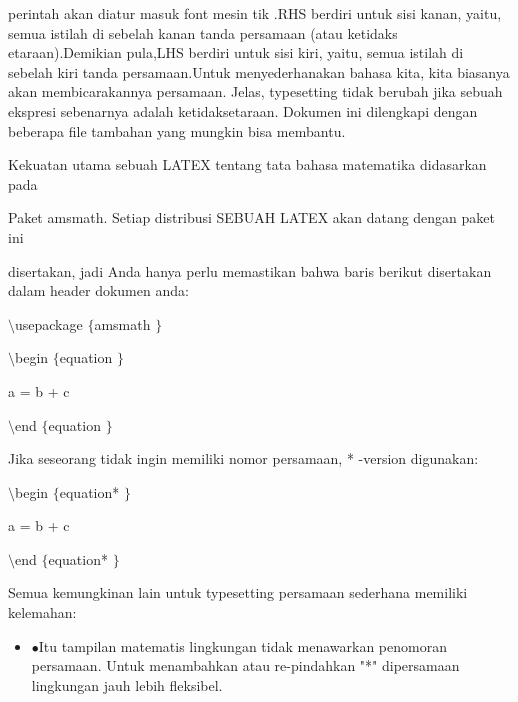 \noindent 
perintah akan diatur masuk font mesin tik .RHS berdiri untuk sisi kanan, yaitu, semua istilah di sebelah kanan tanda persamaan (atau ketidaks etaraan).Demikian pula,LHS berdiri untuk sisi kiri, yaitu, semua istilah di sebelah kiri tanda persamaan.Untuk menyederhanakan bahasa kita, kita biasanya akan membicarakannya persamaan. Jelas, typesetting tidak berubah jika sebuah ekspresi sebenarnya adalah ketidaksetaraan. Dokumen ini dilengkapi dengan beberapa file tambahan yang mungkin bisa membantu. \par
\noindent 
 \hspace*{0.5in} Kekuatan utama sebuah LATEX tentang tata bahasa matematika didasarkan pada \par
\noindent 
Paket amsmath. Setiap distribusi SEBUAH LATEX akan datang dengan paket ini \par
\noindent 
disertakan, jadi Anda hanya perlu memastikan bahwa baris berikut disertakan dalam header dokumen anda: \par
\noindent 
\vspace{10pt}
\noindent 
 $  \setminus  $usepackage $  \{  $amsmath $  \}  $ \par
\noindent 
\vspace{12pt}
\noindent 
 $  \setminus  $begin $  \{  $equation $  \}  $ \par
\vspace{12pt}
\noindent 
a = b + c \par
\vspace{12pt}
\noindent 
 $  \setminus  $end $  \{  $equation $  \}  $ \par
\vspace{12pt}
\noindent 
Jika seseorang tidak ingin memiliki nomor persamaan, * -version digunakan: \par
\vspace{12pt}
\noindent 
 $  \setminus  $begin $  \{  $equation* $  \}  $ \par
\vspace{12pt}
\noindent 
a = b + c \par
\vspace{12pt}
\noindent 
 $  \setminus  $end $  \{  $equation* $  \}  $ \par
\vspace{12pt}
\noindent 
Semua kemungkinan lain untuk typesetting persamaan sederhana memiliki kelemahan: \par
\noindent 
\begin{itemize}
\item  $ \bullet $Itu tampilan matematis lingkungan tidak menawarkan penomoran persamaan. Untuk menambahkan atau re-pindahkan "*" dipersamaan lingkungan jauh lebih fleksibel.\end{itemize}
